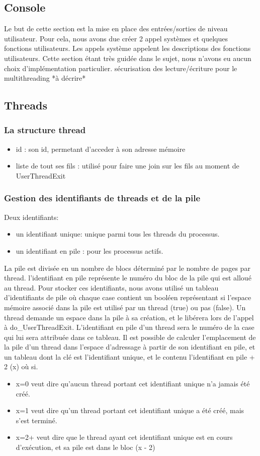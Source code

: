 \documentclass{article}
\begin{document}
	\subsection{Console}
	    {Le but de cette section est la mise en place des entrées/sorties de niveau utilisateur. Pour cela, nous avons due créer 2 appel systèmes et quelques fonctions utilisateurs. Les appels système appelent les descriptions des fonctions utilisateurs. Cette section étant très guidée dans le sujet, nous n'avons eu aucun choix d'implémentation particulier.
	    sécurisation des lecture/écriture pour le multithreading
		*à décrire*}
	\subsection{Threads}
		\subsubsection{La structure thread}
			\begin{itemize}
				\item id : son id, permetant d'acceder à son adresse mémoire
				\item liste de tout ses fils : utilisé pour faire une join sur les fils au moment de UserThreadExit
			\end{itemize}
		\subsubsection{Gestion des identifiants de threads et de la pile}
			{Deux identifiants:}
			\begin{itemize}
				\item{un identifiant unique: unique parmi tous les threads du processus.}
				\item{un identifiant en pile : pour les processus actifs.}
			\end{itemize}
			{La pile est divisée en un nombre de blocs déterminé par le nombre de pages par thread. l'identifiant en pile représente le numéro du bloc de la pile qui est alloué au thread. Pour stocker ces identifiants, nous avons utilisé un tableau d'identifiants de pile où chaque case contient un booléen représentant si l'espace mémoire associé dans la pile est utilisé par un thread (true) ou pas (false). }
			{Un thread demande un espace dans la pile à sa création, et le libérera lors de l'appel à do\_UserThreadExit. L'identifiant en pile d'un thread sera le numéro de la case qui lui sera attribuée dans ce tableau. Il est possible de calculer l'emplacement de la pile d'un thread dans l'espace d'adressage à partir de son identifiant en pile, et un tableau dont la clé est l'identifiant unique, et le contenu l'identifiant en pile + 2 (x) où si.}
				\begin{itemize}
					\item{x=0 veut dire qu'aucun thread portant cet identifiant unique n'a jamais été créé.}
					\item{x=1 veut dire qu'un thread portant cet identifiant unique a été créé, mais s'est terminé.}
					\item{x=2+ veut dire que le thread ayant cet identifiant unique est en cours d'exécution, et sa pile est dans le bloc (x - 2)}
				\end{itemize}
\end{document}
